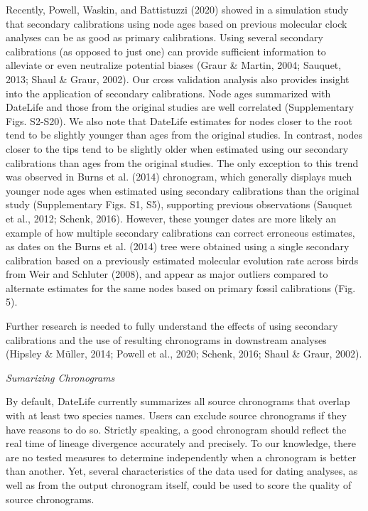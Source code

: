 \documentclass[english,man]{apa6}
\begin{document}
Recently, Powell, Waskin, and Battistuzzi (2020) showed in a simulation study that secondary calibrations using node ages based on previous molecular clock analyses can be as good as primary calibrations.
Using several secondary calibrations (as opposed to just one) can provide sufficient information to alleviate or even neutralize potential biases (Graur \& Martin, 2004; Sauquet, 2013; Shaul \& Graur, 2002). Our cross validation analysis also provides insight into the application of secondary calibrations. Node ages summarized with DateLife and those from the original studies are well correlated (Supplementary Figs. S2-S20). We also note that DateLife estimates for nodes closer to the root tend to be slightly younger than ages from the original studies. In contrast, nodes closer to the tips tend to be slightly older when estimated using our secondary calibrations than ages from the original studies. The only exception to this trend was observed in Burns et al. (2014) chronogram, which generally displays much younger node ages when estimated using secondary calibrations than the original study (Supplementary Figs. S1, S5), supporting previous observations (Sauquet et al., 2012; Schenk, 2016). However, these younger dates are more likely an example of how multiple secondary calibrations can correct erroneous estimates, as dates on the Burns et al. (2014) tree were obtained using a single secondary calibration based on a previously estimated molecular evolution rate across birds from Weir and Schluter (2008), and appear as major outliers compared to alternate estimates for the same nodes based on primary fossil calibrations (Fig. 5).

Further research is needed to fully understand the effects of using secondary calibrations and the use of resulting chronograms in downstream analyses (Hipsley \& Müller, 2014; Powell et al., 2020; Schenk, 2016; Shaul \& Graur, 2002).

\begin{center}
\emph{Sumarizing Chronograms}
\end{center}

By default, DateLife currently summarizes all source chronograms that overlap with at least two species names. Users can exclude source chronograms if they have reasons to do so.
Strictly speaking, a good chronogram should reflect the real time of lineage divergence accurately and precisely.
To our knowledge, there are no tested measures to determine independently when a chronogram is better than another. Yet, several characteristics of the data used for dating analyses, as well as from the output chronogram itself, could be used to score the quality of source chronograms.
\end{document}
